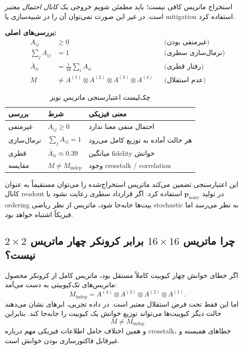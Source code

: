 استخراج ماتریس کافی نیست؛ باید مطمئن شویم خروجی یک \emph{کانال احتمال معتبر} است. در غیر این صورت نمی‌توان آن را در شبیه‌سازی یا mitigation استفاده کرد.

\textbf{بررسی‌های اصلی:}
\begin{align}
	A_{ij} &\ge 0 && \text{(غیرمنفی بودن)} \label{eq:val-nonneg}\\
	\sum_{j} A_{ij} &= 1 && \text{(نرمال‌سازی سطری)} \label{eq:val-row}\\
	\bar{A}_{ii} &= \frac{1}{16}\sum_i A_{ii} && \text{(رفتار قطری)} \label{eq:val-diag}\\
	M &\neq A^{(1)}\otimes A^{(2)}\otimes A^{(3)}\otimes A^{(4)} && \text{(عدم استقلال)} \label{eq:val-kron}
\end{align}

\begin{table}[htbp]
\centering
\caption{چک‌لیست اعتبارسنجی ماتریس نویز}
\label{tab:matrix-validation}
\begin{tabular}{lll}
\toprule
بررسی & شرط & معنی فیزیکی \\
\midrule
غیرمنفی & $A_{ij}\ge0$ & احتمال منفی معنا ندارد \\
نرمال‌سازی & $\sum_j A_{ij}=1$ & هر حالت آماده به توزیع کامل می‌رود \\
قطری & $\bar{A}_{ii}\approx0.39$ & میانگین fidelity خوانش \\
مقایسه & $M\neq M_{\mathrm{indep}}$ & وجود crosstalk / correlation \\
\bottomrule
\end{tabular}
\end{table}

این اعتبارسنجی تضمین می‌کند ماتریس استخراج‌شده را می‌توان مستقیماً به عنوان کانال readout در تولید $\mathbf{p}_{\mathrm{noisy}}$ استفاده کرد. اگر قرارداد سطری  رعایت نشود یا ordering بیت‌ها جابه‌جا شود، ماتریس از نظر ریاضی stochastic به نظر می‌رسد اما فیزیکاً اشتباه خواهد بود.

\subsection{چرا ماتریس $16\times16$ برابر کرونکر چهار ماتریس $2\times2$ نیست؟}

اگر خطای خوانش چهار کیوبیت کاملاً مستقل بود، ماتریس کامل از کرونکر محصول ماتریس‌های تک‌کیوبیتی به دست می‌آمد:
\begin{equation}
	M_{\mathrm{indep}}
	=
	A^{(4)}\otimes A^{(3)}\otimes A^{(2)}\otimes A^{(1)}.
	\label{eq:kron}
\end{equation}
اما این فقط تحت فرض استقلال معتبر است. در داده تجربی، ابرهای  نشان می‌دهند حالت دیگر کیوبیت‌ها می‌تواند توزیع خوانش یک کیوبیت را جابه‌جا کند. بنابراین
\[
	M \neq M_{\mathrm{indep}}
\]
و همین اختلاف حامل اطلاعات فیزیکی مهم درباره crosstalk، خطاهای همبسته و غیرقابل فاکتورسازی بودن خوانش است.

